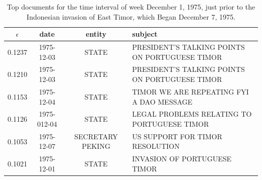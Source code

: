 \begin{table}[tb]
\small
\centering
\begin{tabular}{cccl}
\toprule
$\epsilon$ & date & entity & subject \\
\midrule
0.1237 & 1975-12-03 & {\footnotesize STATE} & {\footnotesize PRESIDENT'S TALKING POINTS ON PORTUGUESE TIMOR } \\
0.1210   &  1975-12-03 & {\footnotesize STATE} & {\footnotesize    PRESIDENT'S TALKING POINTS ON PORTUGUESE TIMOR }\\
0.1153   &  1975-12-04  &  {\footnotesize STATE  }  & {\footnotesize  TIMOR WE ARE REPEATING FYI A DAO MESSAGE}\\
0.1126   &  1975-012-04  &  {\footnotesize STATE   }  &  {\footnotesize  LEGAL PROBLEMS RELATING TO PORTUGUESE TIMOR}\\
0.1053   &  1975-12-07  &  {\footnotesize SECRETARY PEKING } & {\footnotesize US SUPPORT FOR TIMOR RESOLUTION }\\
0.1021   &  1975-12-01  &  {\footnotesize STATE } & {\footnotesize  INVASION OF PORTUGUESE TIMOR } \\
\bottomrule
\end{tabular}
\label{tab:timor}
\caption{Top documents for the time interval of week December 1, 1975, just prior to the Indonesian invasion of East Timor, which Began December 7, 1975.}
\end{table}


